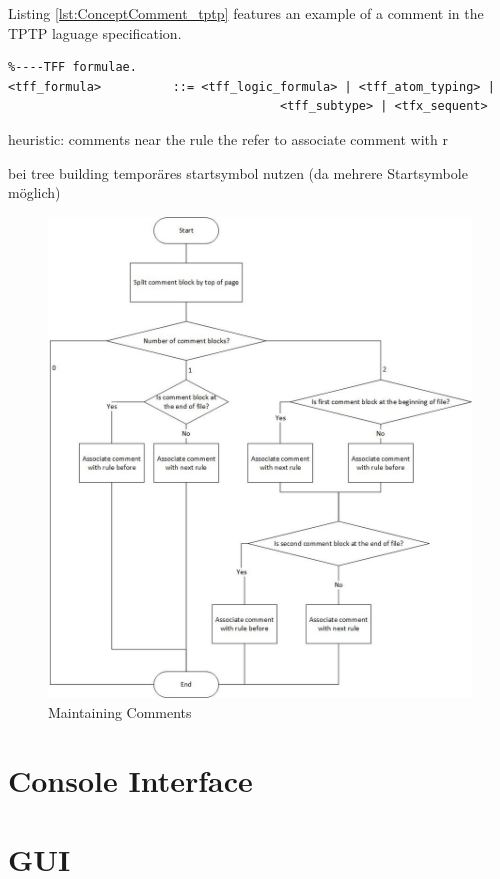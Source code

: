 Listing \ref{lst:ConceptComment_tptp} features an example of a comment in the \ac{TPTP} laguage specification.
\begin{lstlisting}[basicstyle=\scriptsize	,caption= Example of a comment in the \ac{TPTP} language specification,label= lst:ConceptComment_tptp]
%----Top of Page---------------------------------------------------------------
%----TFF formulae.
<tff_formula>          ::= <tff_logic_formula> | <tff_atom_typing> |
                           			  <tff_subtype> | <tfx_sequent>
\end{lstlisting}
heuristic:
comments near the rule the refer to
associate comment with r

bei tree building temporäres startsymbol nutzen (da mehrere Startsymbole möglich)

\begin{figure}[H]
\centering
\includegraphics[width=1\textwidth]{images/maintainingComments.jpg}
\caption{Maintaining Comments}
\label{fig:comments}

\end{figure}

\section{Console Interface}\label{sec:Console Interface}

\section{GUI}\label{sec:ConceptGUI}



